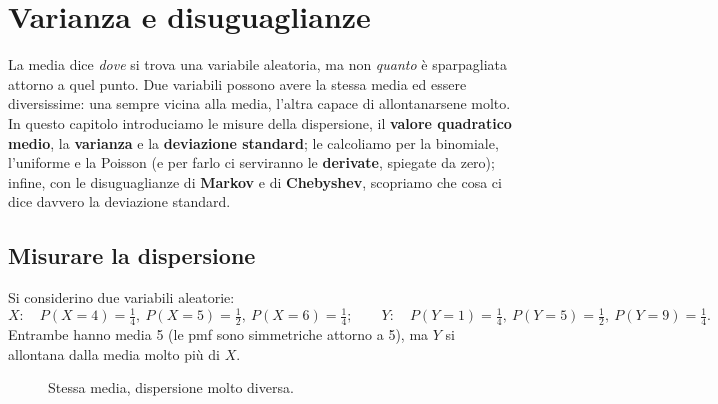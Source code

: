 \chapter{Varianza e disuguaglianze}

La media dice \emph{dove} si trova una variabile aleatoria, ma non \emph{quanto} è sparpagliata attorno a quel punto.
Due variabili possono avere la stessa media ed essere diversissime: una sempre vicina alla media, l'altra capace di
allontanarsene molto. In questo capitolo introduciamo le misure della dispersione, il \textbf{valore quadratico
medio}, la \textbf{varianza} e la \textbf{deviazione standard}; le calcoliamo per la binomiale, l'uniforme e la Poisson
(e per farlo ci serviranno le \textbf{derivate}, spiegate da zero); infine, con le disuguaglianze di \textbf{Markov} e
di \textbf{Chebyshev}, scopriamo che cosa ci dice davvero la deviazione standard.

\section{Misurare la dispersione}

Si considerino due variabili aleatorie:
\[
  X: \quad P(X = 4) = \tfrac14,\ P(X = 5) = \tfrac12,\ P(X = 6) = \tfrac14 ;
  \qquad
  Y: \quad P(Y = 1) = \tfrac14,\ P(Y = 5) = \tfrac12,\ P(Y = 9) = \tfrac14 .
\]
Entrambe hanno media 5 (le pmf sono simmetriche attorno a 5), ma $Y$ si allontana dalla media molto più di $X$.

\begin{figure}[H]
\centering
{}
\caption{Stessa media, dispersione molto diversa.}
\end{figure}

